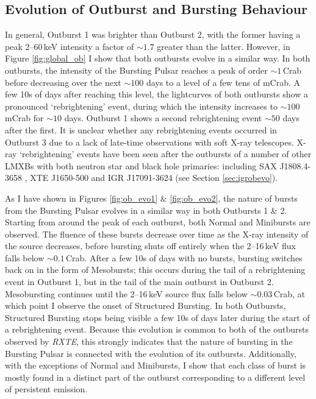 \subsection{Evolution of Outburst and Bursting Behaviour}

\par In general, Outburst 1 was brighter than Outburst 2, with the former having a peak 2--60\,keV intensity a factor of $\sim1.7$ greater than the latter.  However, in Figure \ref{fig:global_ob} I show that both outbursts evolve in a similar way.  In both outbursts, the intensity of the Bursting Pulsar reaches a peak of order $\sim1$\,Crab before decreasing over the next $\sim100$ days to a level of a few tens of mCrab.  A few 10s of days after reaching this level, the lightcurves of both outbursts show a pronounced `rebrightening' event, during which the intensity increases to $\sim100$\,mCrab for $\sim10$ days.  Outburst 1 shows a second rebrightening event $\sim50$ days after the first.  It is unclear whether any rebrightening events occurred in Outburst 3 due to a lack of late-time observations with soft X-ray telescopes.  X-ray `rebrightening' events have been seen after the outbursts of a number of other LMXBs with both neutron star and black hole primaries: including SAX J1808.4-3658 \citep{Wijnands_1808}, XTE J1650-500 \citep{Tomsick_MiniOutbursts} and IGR J17091-3624 (see Section \ref{sec:igrobevo}).
\par As I have shown in Figures \ref{fig:ob_evo1} \& \ref{fig:ob_evo2}, the nature of bursts from the Bursting Pulsar evolves in a similar way in both Outbursts 1 \& 2.  Starting from around the peak of each outburst, both Normal and Minibursts are observed.  The fluence of these bursts decrease over time as the X-ray intensity of the source decreases, before bursting shuts off entirely when the 2--16\,keV flux falls below $\sim0.1$\,Crab.  After a few 10s of days with no bursts, bursting switches back on in the form of Mesobursts; this occurs during the tail of a rebrightening event in Outburst 1, but in the tail of the main outburst in Outburst 2.  Mesobursting continues until the 2--16\,keV source flux falls below $\sim0.03$\,Crab, at which point I observe the onset of Structured Bursting.  In both Outbursts, Structured Bursting stops being visible a few 10s of days later during the start of a rebrightening event.  Because this evolution is common to both of the outbursts observed by \indexrxte\textit{RXTE}, this strongly indicates that the nature of bursting in the Bursting Pulsar is connected with the evolution of its outbursts.  Additionally, with the exceptions of Normal and Minibursts, I show that each class of burst is mostly found in a distinct part of the outburst corresponding to a different level of persistent emission.
